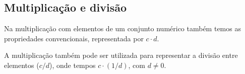 \subsection{Multiplicação e divisão}

Na multiplicação com elementos de um conjunto numérico também temos as propriedades convencionais, representada por $c \cdot d$. 

A multiplicação também pode ser utilizada para representar a divisão entre elementos ($c/d$), onde tempos $c \cdot (1/d)$, com $d \ne 0$.